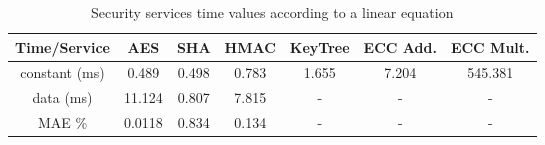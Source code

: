 \begin{table}[]
\centering
\def\arraystretch{1.5}
\begin{tabular}{|c|c|c|c|c|c|c|}
\hline
Time/Service   & AES     & SHA    & HMAC    & KeyTree & ECC Add. & ECC Mult.   \\ \hline
constant (ms) & 0.489  & 0.498  & 0.783   & 1.655   & 7.204   & 545.381 \\ \hline
data (ms) & 11.124  & 0.807 & 7.815   & -       & -       & -      \\ \hline
MAE \%	   & 0.0118  & 0.834  & 0.134   & -	  & -	    & -   \\ \hline
\end{tabular}
\caption{Security services time values according to a linear equation}
\label{tab:core-model}
\end{table}
